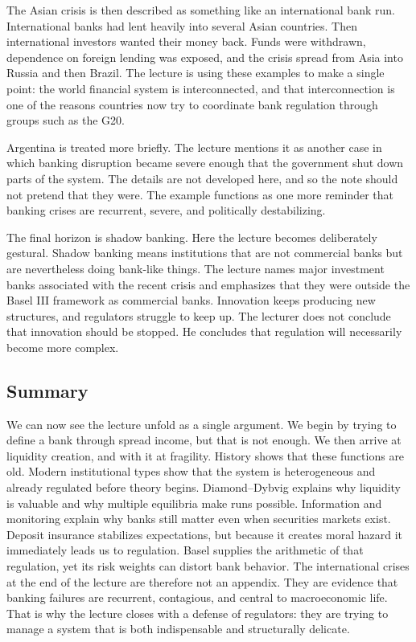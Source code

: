 The Asian crisis is then described as something like an international bank run. International banks had lent heavily into several Asian countries. Then international investors wanted their money back. Funds were withdrawn, dependence on foreign lending was exposed, and the crisis spread from Asia into Russia and then Brazil. The lecture is using these examples to make a single point: the world financial system is interconnected, and that interconnection is one of the reasons countries now try to coordinate bank regulation through groups such as the G20.

Argentina is treated more briefly. The lecture mentions it as another case in which banking disruption became severe enough that the government shut down parts of the system. The details are not developed here, and so the note should not pretend that they were. The example functions as one more reminder that banking crises are recurrent, severe, and politically destabilizing.

The final horizon is shadow banking. Here the lecture becomes deliberately gestural. Shadow banking means institutions that are not commercial banks but are nevertheless doing bank-like things. The lecture names major investment banks associated with the recent crisis and emphasizes that they were outside the Basel III framework as commercial banks. Innovation keeps producing new structures, and regulators struggle to keep up. The lecturer does not conclude that innovation should be stopped. He concludes that regulation will necessarily become more complex.

\subsection{Summary}

We can now see the lecture unfold as a single argument. We begin by trying to define a bank through spread income, but that is not enough. We then arrive at liquidity creation, and with it at fragility. History shows that these functions are old. Modern institutional types show that the system is heterogeneous and already regulated before theory begins. Diamond--Dybvig explains why liquidity is valuable and why multiple equilibria make runs possible. Information and monitoring explain why banks still matter even when securities markets exist. Deposit insurance stabilizes expectations, but because it creates moral hazard it immediately leads us to regulation. Basel supplies the arithmetic of that regulation, yet its risk weights can distort bank behavior. The international crises at the end of the lecture are therefore not an appendix. They are evidence that banking failures are recurrent, contagious, and central to macroeconomic life. That is why the lecture closes with a defense of regulators: they are trying to manage a system that is both indispensable and structurally delicate.